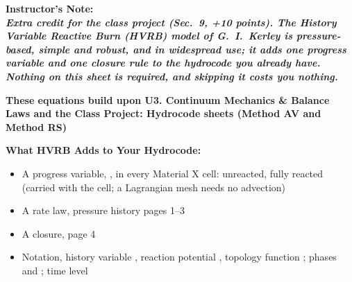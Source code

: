 \documentclass[11pt,addpoints]{exam}
\begin{document}
\noindent
\bf{Instructor's Note:}\normalfont\\

\noindent
\it{Extra credit for the class project (Sec.~9, +10 points). The History Variable Reactive Burn (HVRB) model of G.~I.~Kerley is pressure-based, simple and robust, and in widespread use; it adds one progress variable and one closure rule to the hydrocode you already have. Nothing on this sheet is required, and skipping it costs you nothing.}\normalfont\vspace{1.5em}

\textbf{These equations build upon U3. Continuum Mechanics {\&} Balance Laws and the Class Project: Hydrocode sheets (Method AV and Method RS)}\vspace{1em}


\begin{tcolorbox}[breakable]
\textbf{What HVRB Adds to Your Hydrocode:}\vspace{.5em}
\begin{itemize}
\item A progress variable, \hspace{3mm} \bm{$\lambda$}, \hspace{2mm} in every Material X cell: \hspace{2mm}  unreacted,  fully reacted \hspace{3mm} (carried with the cell; a Lagrangian mesh needs no advection)\vspace{.5em}
\item A rate law, \hspace{3mm} pressure history \bm{$\rightarrow$} \bm{$\lambda$} \hspace{7mm} pages 1--3\vspace{.5em}
\item A closure, \hspace{3mm}  \hspace{7mm} page 4\vspace{.5em}
\item Notation, \hspace{3mm} history variable \bm{$\phi$}, \hspace{2mm} reaction potential \bm{$\Phi$}, \hspace{2mm} topology function ; \hspace{2mm} phases  and ; \hspace{2mm} time level \vspace{.5em}

\end{itemize}
\end{tcolorbox}
\end{document}
